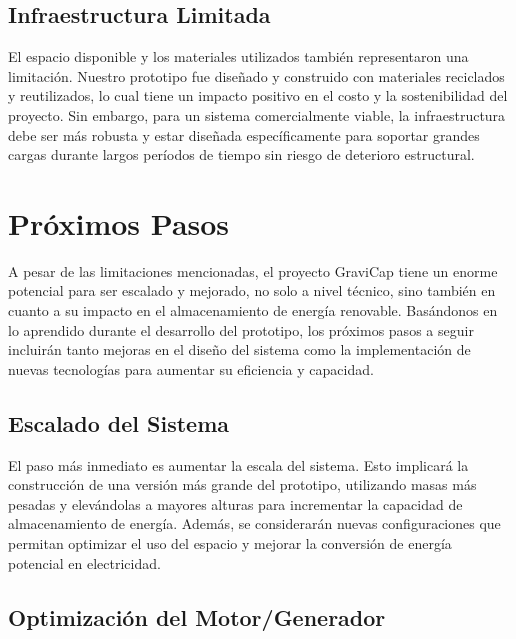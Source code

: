         \subsection{Infraestructura Limitada}
            El espacio disponible y los materiales utilizados también representaron una limitación. Nuestro prototipo fue diseñado y construido con materiales reciclados y reutilizados, lo cual tiene un impacto positivo en el costo y la sostenibilidad del proyecto. Sin embargo, para un sistema comercialmente viable, la infraestructura debe ser más robusta y estar diseñada específicamente para soportar grandes cargas durante largos períodos de tiempo sin riesgo de deterioro estructural.\par
    
    \section{Próximos Pasos}
    
        A pesar de las limitaciones mencionadas, el proyecto \textcolor{dark_violet}{GraviCap} tiene un enorme potencial para ser escalado y mejorado, no solo a nivel técnico, sino también en cuanto a su impacto en el almacenamiento de energía renovable. Basándonos en lo aprendido durante el desarrollo del prototipo, los próximos pasos a seguir incluirán tanto mejoras en el diseño del sistema como la implementación de nuevas tecnologías para aumentar su eficiencia y capacidad.\par
        
        \subsection{Escalado del Sistema}
        
            El paso más inmediato es aumentar la escala del sistema. Esto implicará la construcción de una versión más grande del prototipo, utilizando masas más pesadas y elevándolas a mayores alturas para incrementar la capacidad de almacenamiento de energía. Además, se considerarán nuevas configuraciones que permitan optimizar el uso del espacio y mejorar la conversión de energía potencial en electricidad.\par
            
        \subsection{Optimización del Motor/Generador}
        
